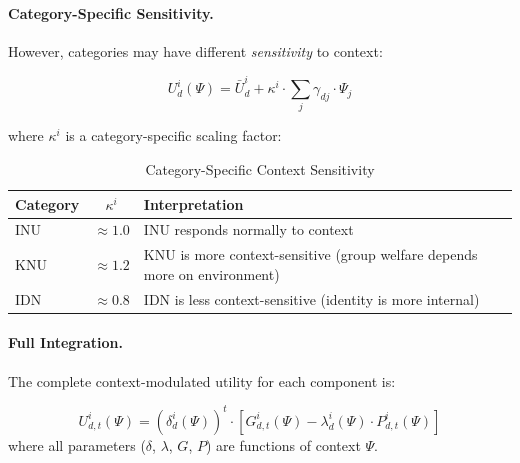 \paragraph{Category-Specific Sensitivity.}
However, categories may have different \emph{sensitivity} to context:

\begin{tcolorbox}[colback=green!5!white, colframe=green!50!black]
\begin{equation}
\boxed{
U^i_d(\Psi) = \bar{U}^i_d + \kappa^i \cdot \sum_{j} \gamma_{dj} \cdot \Psi_j
}
\label{eq:app-c-kappa-scaling}
\end{equation}
\end{tcolorbox}

where $\kappa^i$ is a category-specific scaling factor:

\begin{table}[htbp]
\centering
\caption{Category-Specific Context Sensitivity}
\label{tab:app-c-kappa-factors}
\renewcommand{\arraystretch}{1.3}
\begin{tabular}{@{}lcl@{}}
\toprule
\textbf{Category} & $\kappa^i$ & \textbf{Interpretation} \\
\midrule
INU & $\approx 1.0$ & INU responds normally to context \\
KNU & $\approx 1.2$ & KNU is more context-sensitive (group welfare depends more on environment) \\
IDN & $\approx 0.8$ & IDN is less context-sensitive (identity is more internal) \\
\bottomrule
\end{tabular}
\end{table}

\paragraph{Full Integration.}
The complete context-modulated utility for each component is:

\begin{tcolorbox}[colback=blue!5!white, colframe=blue!50!black]
\begin{equation}
\boxed{
U^i_{d,t}(\Psi) = (\delta^i_d(\Psi))^t \cdot \left[ G^i_{d,t}(\Psi) - \lambda^i_d(\Psi) \cdot P^i_{d,t}(\Psi) \right]
}
\label{eq:app-c-full-context-integration}
\end{equation}
where all parameters ($\delta$, $\lambda$, $G$, $P$) are functions of context $\Psi$.
\end{tcolorbox}

